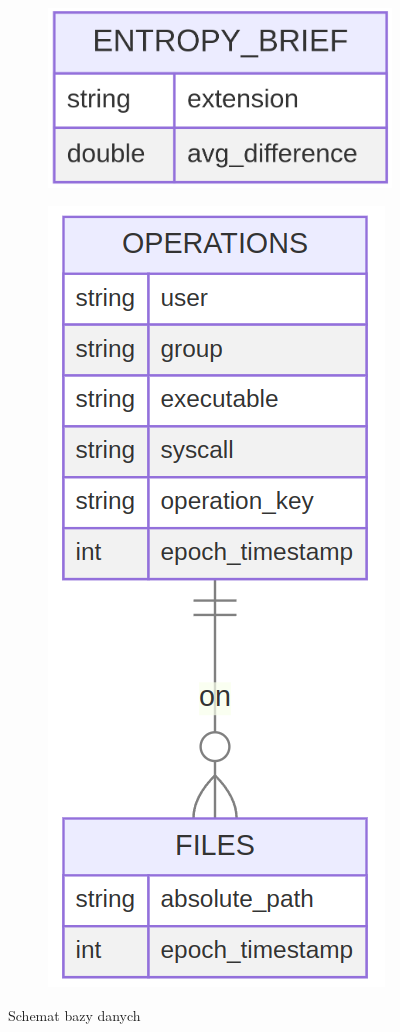 \begin{figure}[H]
    \centering
    \begin{subfigure}{.5\textwidth}
      \centering
      \includegraphics[width=.5\linewidth]{rysunki/db.png} %
      \label{rys:wektorowopdf}
    \end{subfigure}%
    \begin{subfigure}{.5\textwidth}
      \centering
      \includegraphics[width=.5\linewidth]{rysunki/db2.png}
      \label{rys:wektorowopng}
    \end{subfigure}
    \caption{Schemat bazy danych}
    \label{rys:wektorowo}
\end{figure}

